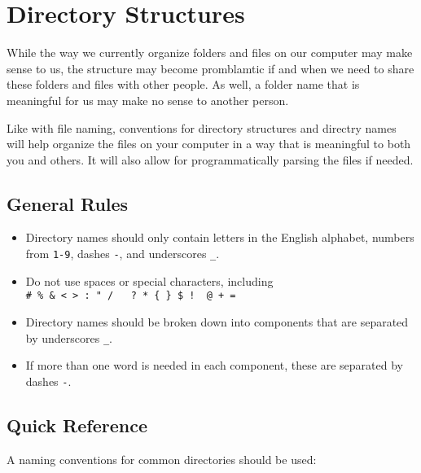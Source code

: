\documentclass[
]{book}
\providecommand{\tightlist}{%
  \setlength{\itemsep}{0pt}\setlength{\parskip}{0pt}}
\begin{document}
\hypertarget{directory-structures-1}{%
\chapter*{Directory Structures}\label{directory-structures-1}}

While the way we currently organize folders and files on our computer may make sense to us, the structure may become promblamtic if and when we need to share these folders and files with other people. As well, a folder name that is meaningful for us may make no sense to another person.

Like with file naming, conventions for directory structures and directry names will help organize the files on your computer in a way that is meaningful to both you and others. It will also allow for programmatically parsing the files if needed.

\hypertarget{general-rules-2}{%
\section*{General Rules}\label{general-rules-2}}

\begin{itemize}
\tightlist
\item
  Directory names should only contain letters in the English alphabet, numbers from \texttt{1-9}, dashes \texttt{-}, and underscores \texttt{\_}.
\item
  Do not use spaces \texttt{} or special characters, including \texttt{\#\ \%\ \&\ \textless{}\ \textgreater{}\ :\ "\ /\ \ \textbar{}\ ?\ *\ \{\ \}\ \$\ !\ \textquotesingle{}\ @\ +\ =}
\item
  Directory names should be broken down into components that are separated by underscores \texttt{\_}.
\item
  If more than one word is needed in each component, these are separated by dashes \texttt{-}.
\end{itemize}

\hypertarget{quick-reference-1}{%
\section*{Quick Reference}\label{quick-reference-1}}

A naming conventions for common directories should be used:
\end{document}
